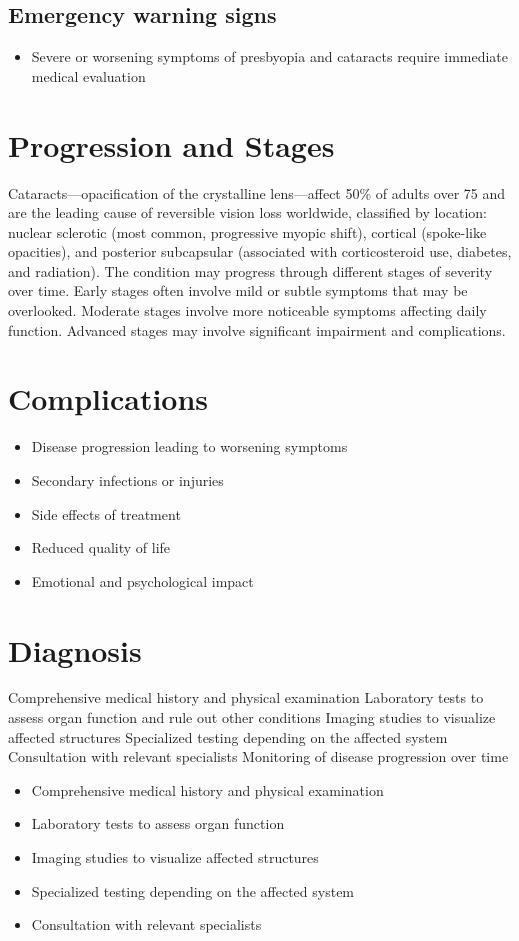\subsection{Emergency warning signs}
\begin{itemize}[noitemsep]
  \item Severe or worsening symptoms of presbyopia and cataracts require immediate medical evaluation
\end{itemize}
\section{Progression and Stages}
Cataracts---opacification of the crystalline lens---affect 50\% of adults over 75 and are the leading cause of reversible vision loss worldwide, classified by location: nuclear sclerotic (most common, progressive myopic shift), cortical (spoke-like opacities), and posterior subcapsular (associated with corticosteroid use, diabetes, and radiation). The condition may progress through different stages of severity over time. Early stages often involve mild or subtle symptoms that may be overlooked. Moderate stages involve more noticeable symptoms affecting daily function. Advanced stages may involve significant impairment and complications.
\section{Complications}
\begin{itemize}[noitemsep]
  \item Disease progression leading to worsening symptoms
  \item Secondary infections or injuries
  \item Side effects of treatment
  \item Reduced quality of life
  \item Emotional and psychological impact
\end{itemize}
\section{Diagnosis}
Comprehensive medical history and physical examination Laboratory tests to assess organ function and rule out other conditions Imaging studies to visualize affected structures Specialized testing depending on the affected system Consultation with relevant specialists Monitoring of disease progression over time

\begin{itemize}[noitemsep]
  \item Comprehensive medical history and physical examination
  \item Laboratory tests to assess organ function
  \item Imaging studies to visualize affected structures
  \item Specialized testing depending on the affected system
  \item Consultation with relevant specialists
\end{itemize}
